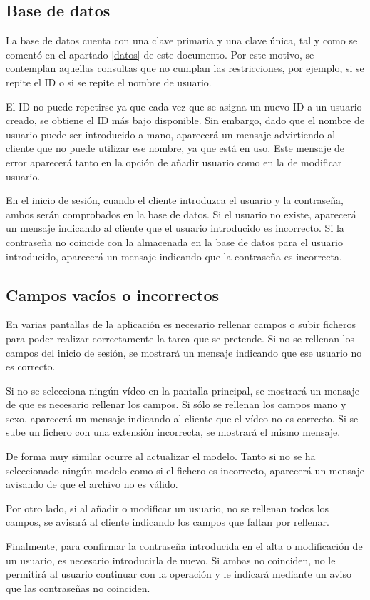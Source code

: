 \subsection{Base de datos}
La base de datos cuenta con una clave primaria y una clave única, tal y como se comentó en el apartado \ref{datos} de este documento. Por este motivo, se contemplan aquellas consultas que no cumplan las restricciones, por ejemplo, si se repite el ID o si se repite el nombre de usuario.

El ID no puede repetirse ya que cada vez que se asigna un nuevo ID a un usuario creado, se obtiene el ID más bajo disponible. Sin embargo, dado que el nombre de usuario puede ser introducido a mano, aparecerá un mensaje advirtiendo al cliente que no puede utilizar ese nombre, ya que está en uso. Este mensaje de error aparecerá tanto en la opción de añadir usuario como en la de modificar usuario.

En el inicio de sesión, cuando el cliente introduzca el usuario y la contraseña, ambos serán comprobados en la base de datos. Si el usuario no existe, aparecerá un mensaje indicando al cliente que el usuario introducido es incorrecto. Si la contraseña no coincide con la almacenada en la base de datos para el usuario introducido, aparecerá un mensaje indicando que la contraseña es incorrecta.

\subsection{Campos vacíos o incorrectos}
En varias pantallas de la aplicación es necesario rellenar campos o subir ficheros para poder realizar correctamente la tarea que se pretende. Si no se rellenan los campos del inicio de sesión, se mostrará un mensaje indicando que ese usuario no es correcto.

Si no se selecciona ningún vídeo en la pantalla principal, se mostrará un mensaje de que es necesario rellenar los campos. Si sólo se rellenan los campos mano y sexo, aparecerá un mensaje indicando al cliente que el vídeo no es correcto. Si se sube un fichero con una extensión incorrecta, se mostrará el mismo mensaje.

De forma muy similar ocurre al actualizar el modelo. Tanto si no se ha seleccionado ningún modelo como si el fichero es incorrecto, aparecerá un mensaje avisando de que el archivo no es válido.

Por otro lado, si al añadir o modificar un usuario, no se rellenan todos los campos, se avisará al cliente indicando los campos que faltan por rellenar.

Finalmente, para confirmar la contraseña introducida en el alta o modificación de un usuario, es necesario introducirla de nuevo. Si ambas no coinciden, no le permitirá al usuario continuar con la operación y le indicará mediante un aviso que las contraseñas no coinciden.
